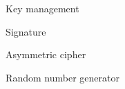 \begin{frame}
\begin{columns}
\begin{column}{0.5\textwidth}


\end{column}

\begin{column}{0.5\textwidth}


\begin{block}{Key management}


\end{block}


\begin{block}{Signature}


\end{block}




\begin{block}{Asymmetric cipher}


\end{block}


\begin{block}{Random number generator}



\end{block}
\end{column}
\end{columns}
\end{frame}
